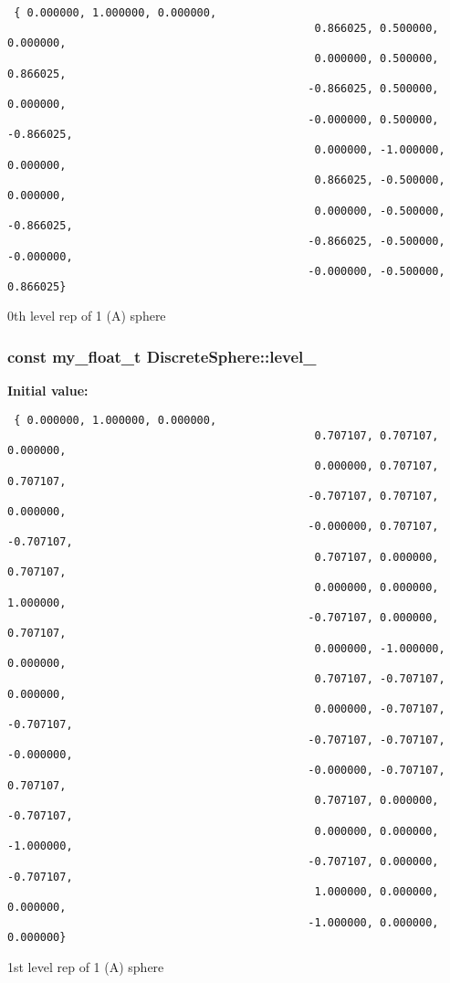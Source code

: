 \begin{Code}\begin{verbatim} { 0.000000, 1.000000, 0.000000,
                                               0.866025, 0.500000, 0.000000,
                                               0.000000, 0.500000, 0.866025,
                                              -0.866025, 0.500000, 0.000000,
                                              -0.000000, 0.500000, -0.866025,
                                               0.000000, -1.000000, 0.000000,
                                               0.866025, -0.500000, 0.000000,
                                               0.000000, -0.500000, -0.866025,
                                              -0.866025, -0.500000, -0.000000,
                                              -0.000000, -0.500000, 0.866025}
\end{verbatim}\end{Code}
0th level rep of 1 (A) sphere 

\subsubsection{\setlength{\rightskip}{0pt plus 5cm}const my\_\-float\_\-t \bf{Discrete\-Sphere::level\_}\hspace{0.3cm}{\tt  [static, private]}}\label{classASCbase_1_1DiscreteSphere_d3ff32a1e85a1c1f1e321fd09b0ec050}


\textbf{Initial value:}

\begin{Code}\begin{verbatim} { 0.000000, 1.000000, 0.000000,
                                               0.707107, 0.707107, 0.000000,
                                               0.000000, 0.707107, 0.707107,
                                              -0.707107, 0.707107, 0.000000,
                                              -0.000000, 0.707107, -0.707107,
                                               0.707107, 0.000000, 0.707107,
                                               0.000000, 0.000000, 1.000000,
                                              -0.707107, 0.000000, 0.707107,
                                               0.000000, -1.000000, 0.000000,
                                               0.707107, -0.707107, 0.000000,
                                               0.000000, -0.707107, -0.707107,
                                              -0.707107, -0.707107, -0.000000,
                                              -0.000000, -0.707107, 0.707107,
                                               0.707107, 0.000000, -0.707107,
                                               0.000000, 0.000000, -1.000000,
                                              -0.707107, 0.000000, -0.707107,
                                               1.000000, 0.000000, 0.000000,
                                              -1.000000, 0.000000, 0.000000}
\end{verbatim}\end{Code}
1st level rep of 1 (A) sphere 

